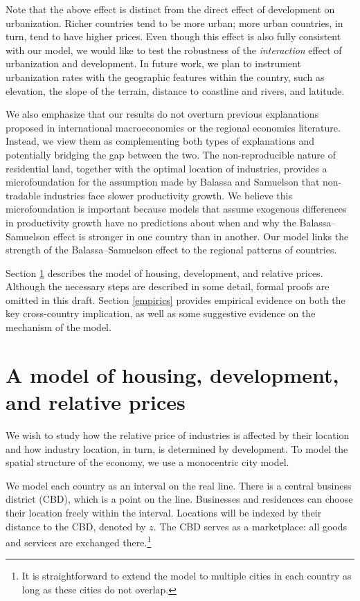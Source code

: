 \documentclass[12pt]{article}
\begin{document}
Note  that the above effect is distinct from the direct effect of development on urbanization. Richer countries tend to be more urban; more urban countries, in turn, tend to have higher prices. Even though this effect is also fully consistent with our model, we would like to test the robustness of the \emph{interaction} effect of urbanization and development. In future work, we plan to instrument urbanization rates with the geographic features within the country, such as elevation, the slope of the terrain, distance to coastline and rivers, and latitude.

We also emphasize that our results do not overturn previous explanations proposed in international macroeconomics or the regional economics literature. Instead, we view them as complementing both types of explanations and potentially bridging the gap between the two. The non-reproducible nature of residential land, together with the optimal location of industries, provides a microfoundation for the {assumption} made by Balassa and Samuelson that non-tradable industries face slower productivity growth. We believe this microfoundation is important because models that assume exogenous differences in productivity growth have no predictions about when and why the Balassa--Samuelson effect is stronger in one country than in another. Our model links the strength of the Balassa--Samuelson effect to the regional patterns of countries.

Section \ref{model} describes the model of housing, development, and relative prices. Although the necessary steps are described in some detail, formal proofs are omitted in this draft. Section \ref{empirics} provides empirical evidence on both the key cross-country implication, as well as some suggestive evidence on the mechanism of the model.

\section{A model of housing, development, and relative prices}\label{model}
We wish to study how the relative price of industries is affected by their location and how industry location, in turn, is determined by development. To model the spatial structure of the economy, we use a monocentric city model.

We model each country as an interval on the real line. There is a central business district (CBD), which is a point on the line. Businesses and residences can choose their location freely within the interval. Locations will be indexed by their distance to the CBD, denoted by $z$. The CBD serves as a marketplace: all goods and services are exchanged there.\footnote{It is straightforward to extend the model to multiple cities in each country as long as these cities do not overlap.}
\end{document}
